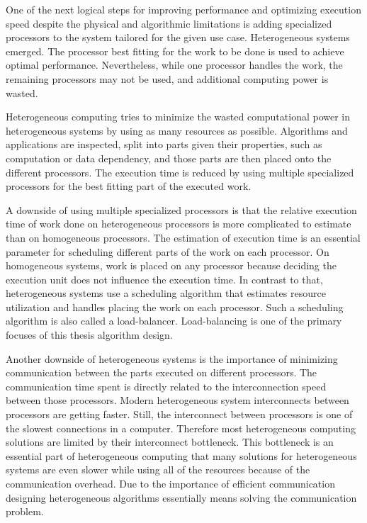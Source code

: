 One of the next logical steps for improving performance and optimizing execution speed despite the physical and algorithmic limitations is adding specialized processors to the system tailored for the given use case. Heterogeneous systems emerged. The processor best fitting for the work to be done is used to achieve optimal performance. Nevertheless, while one processor handles the work, the remaining processors may not be used, and additional computing power is wasted.

Heterogeneous computing tries to minimize the wasted computational power in heterogeneous systems by using as many resources as possible. Algorithms and applications are inspected, split into parts given their properties, such as computation or data dependency, and those parts are then placed onto the different processors. The execution time is reduced by using multiple specialized processors for the best fitting part of the executed work.

A downside of using multiple specialized processors is that the relative execution time of work done on heterogeneous processors is more complicated to estimate than on homogeneous processors. The estimation of execution time is an essential parameter for scheduling different parts of the work on each processor. On homogeneous systems, work is placed on any processor because deciding the execution unit does not influence the execution time. In contrast to that, heterogeneous systems use a scheduling algorithm that estimates resource utilization and handles placing the work on each processor. Such a scheduling algorithm is also called a load-balancer. Load-balancing is one of the primary focuses of this thesis algorithm design.

Another downside of heterogeneous systems is the importance of minimizing communication between the parts executed on different processors. The communication time spent is directly related to the interconnection speed between those processors. Modern heterogeneous system interconnects between processors are getting faster. Still, the interconnect between processors is one of the slowest connections in a computer. Therefore most heterogeneous computing solutions are limited by their interconnect bottleneck. This bottleneck is an essential part of heterogeneous computing that many solutions for heterogeneous systems are even slower while using all of the resources because of the communication overhead. Due to the importance of efficient communication designing heterogeneous algorithms essentially means solving the communication problem.

